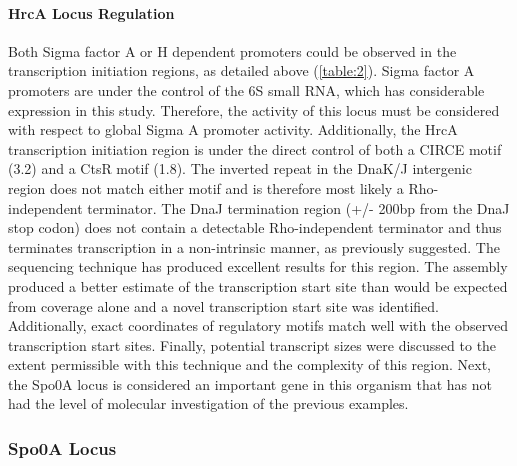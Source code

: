 \paragraph{HrcA Locus Regulation}
Both Sigma factor A or H dependent promoters could be observed in the transcription initiation regions, as detailed above (\ref{table:2}). Sigma factor A promoters are under the control of the 6S small RNA, which has considerable expression in this study. Therefore, the activity of this locus must be considered with respect to global Sigma A promoter activity. Additionally, the HrcA transcription initiation region is under the direct control of both a CIRCE motif (3.2) and a CtsR motif (1.8)\cite{42}. The inverted repeat in the DnaK/J intergenic region does not match either motif and is therefore most likely a Rho-independent terminator. The DnaJ termination region (+/- 200bp from the DnaJ stop codon) does not contain a detectable Rho-independent terminator and thus terminates transcription in a non-intrinsic manner, as previously suggested\cite{83}. The sequencing technique has produced excellent results for this region. The assembly produced a better estimate of the transcription start site than would be expected from coverage alone and a novel transcription start site was identified. Additionally, exact coordinates of regulatory motifs match well with the observed transcription start sites. Finally, potential transcript sizes were discussed to the extent permissible with this technique and the complexity of this region. Next, the Spo0A locus is considered an important gene in this organism that has not had the level of molecular investigation of the previous examples.




\subsubsection{Spo0A Locus}

